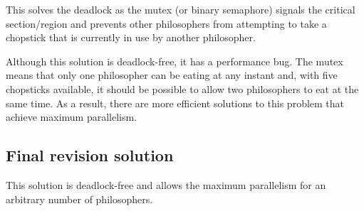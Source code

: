 \documentclass[a4paper]{systems-software}
\begin{document}
This solves the deadlock as the mutex (or binary semaphore) signals the critical section/region and prevents other philosophers from attempting to take a chopstick that is currently in use by another philosopher.

Although this solution is deadlock-free, it has a performance bug. The mutex means that only one philosopher can be eating at any instant and, with five chopsticks available, it should be possible to allow two philosophers to eat at the same time. As a result, there are more efficient solutions to this problem that achieve maximum parallelism.

\subsection*{Final revision solution}

This solution is deadlock-free and allows the maximum parallelism for an arbitrary number of philosophers.
\end{document}
